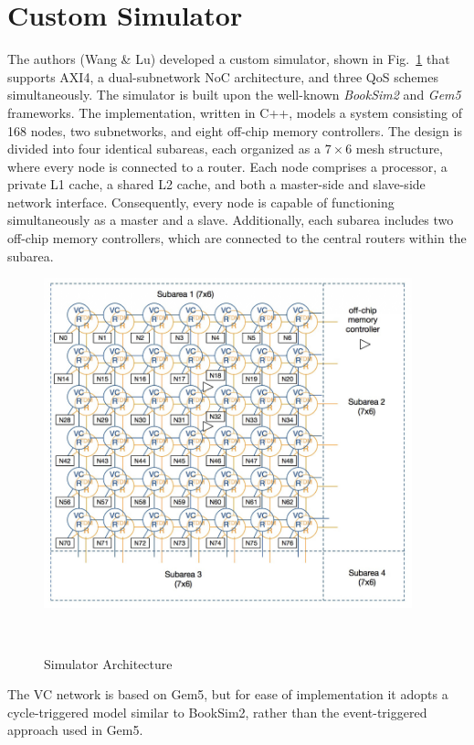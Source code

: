 \section{Custom Simulator}
The authors (Wang \& Lu) developed a custom simulator, shown in Fig.~\ref{fig:simulator_architecture} that supports AXI4, a dual-subnetwork NoC architecture, and three QoS schemes simultaneously. The simulator is built upon the well-known \textit{BookSim2}\cite{jiang_detailed_2013} and \textit{Gem5}\cite{gem5_gem5_nodate} frameworks.
The implementation, written in C++, models a system consisting of 168 nodes, two subnetworks, and eight off-chip memory controllers. The design is divided into four identical subareas, each organized as a $7 \times 6$ mesh structure, where every node is connected to a router.
Each node comprises a processor, a private L1 cache, a shared L2 cache, and both a master-side and slave-side network interface. Consequently, every node is capable of functioning simultaneously as a master and a slave. Additionally, each subarea includes two off-chip memory controllers, which are connected to the central routers within the subarea.

\begin{figure}[htbp]
    \centering
    \includegraphics[width=0.95\textwidth]{img/Simulator_Architecture.png}
    \caption{Simulator Architecture}~\cite{abderazek_multicore_2013}\label{fig:simulator_architecture}
\end{figure}

The VC network is based on Gem5, but for ease of implementation it adopts a cycle-triggered model similar to BookSim2, rather than the event-triggered approach used in Gem5. 

